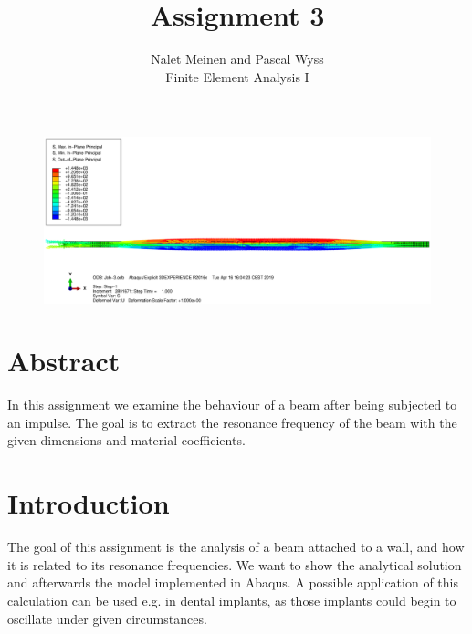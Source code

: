 \documentclass[12pt]{article}
\begin{document}


\title{Assignment 3}%
\author{Nalet Meinen and Pascal Wyss\\ %
Finite Element Analysis I
}


 


\maketitle


\begin{figure}[!htb]
  \centering
  \includegraphics[width=0.95\linewidth]{pics/title}

  \end{figure}

  \pagebreak

\section*{Abstract}
In this assignment we examine the behaviour of a beam after being subjected to an impulse.
The goal is to extract the resonance frequency of the beam with the given dimensions and material coefficients.



\tableofcontents
\pagebreak
\section{Introduction}
The goal of this assignment is the analysis of a beam attached to a wall, 
and how it is related to its resonance frequencies. We want to show the analytical 
solution and afterwards the model implemented in Abaqus. A possible application
of this calculation can be used e.g. in dental implants, 
as those implants could begin to oscillate under given circumstances.
\end{document}
